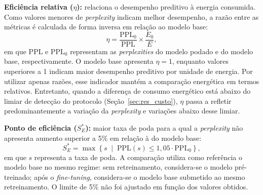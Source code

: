 \textbf{Eficiência relativa ($\eta$):} relaciona o desempenho preditivo à energia
consumida. Como valores menores de \textit{perplexity} indicam melhor desempenho, a razão
entre as métricas é calculada de forma inversa em relação ao modelo base:
\begin{equation}\label{eq:eta}
\eta = \frac{\text{PPL}_0}{\text{PPL}} \times \frac{E_0}{E},
\end{equation}
em que $\text{PPL}$ e $\text{PPL}_0$ representam as \textit{perplexities} do modelo podado e
do modelo base, respectivamente. O modelo base apresenta $\eta = 1$, enquanto valores
superiores a 1 indicam maior desempenho preditivo por unidade de energia. Por utilizar
apenas razões, esse indicador mantém a comparação energética em termos relativos.
Entretanto, quando a diferença de consumo energético está abaixo do limiar de detecção do
protocolo (Seção~\ref{sec:res_custo}), $\eta$ passa a refletir predominantemente a variação
da \textit{perplexity} e variações abaixo desse limiar.

\textbf{Ponto de eficiência ($S^*_E$):} maior taxa de poda para a qual a
\textit{perplexity} não apresenta aumento superior a 5\% em relação à do modelo base:
\begin{equation}\label{eq:ponto_eficiencia}
S^*_E = \max \left\{ s \;\middle|\; \text{PPL}(s) \leq 1{,}05 \cdot \text{PPL}_0 \right\},
\end{equation}
em que $s$ representa a taxa de poda. A comparação utiliza como referência o modelo base no
mesmo regime: sem retreinamento, considera-se o modelo pré-treinado; após o
\textit{fine-tuning}, considera-se o modelo base submetido ao mesmo retreinamento. O limite
de 5\% não foi ajustado em função dos valores obtidos.

